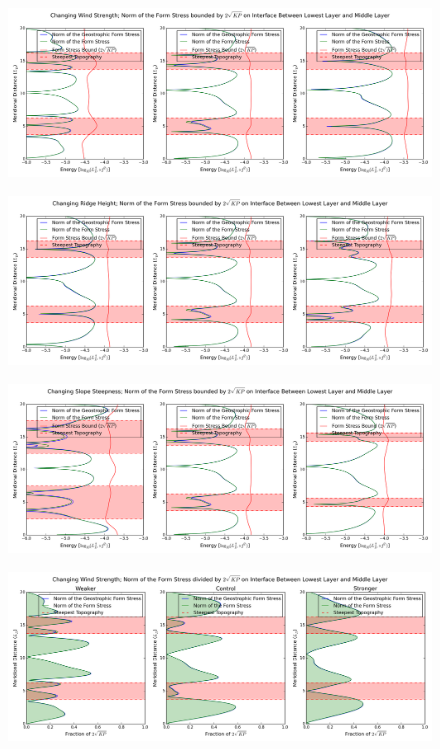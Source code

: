 \documentclass[12pt,a4paper]{report}
\begin{document}
\clearpage

\begin{figure}
	\centering
	\includegraphics[width=\linewidth]{vepebound_0_0}
	\caption{ }
\end{figure}

\begin{figure}
	\centering
	\includegraphics[width=\linewidth]{vepebound_1_0}
	\caption{ }
\end{figure}

\begin{figure}
	\centering
	\includegraphics[width=\linewidth]{vepebound_2_0}
	\caption{ }
\end{figure}

\begin{figure}
	\centering
	\includegraphics[width=\linewidth]{vformnormoverbound_0_0}
	\caption{ }
\end{figure}
\end{document}
